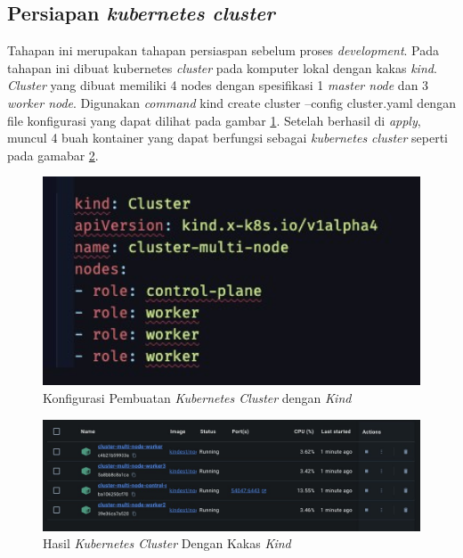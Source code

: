 \subsection{Persiapan \textit{kubernetes cluster}}
\label{subsec:persiapan-kubernetes-cluster}

Tahapan ini merupakan tahapan persiaspan sebelum proses \textit{development}. Pada tahapan ini dibuat kubernetes \textit{cluster} pada komputer lokal dengan kakas \textit{kind}. \textit{Cluster} yang dibuat memiliki 4 nodes dengan spesifikasi 1 \textit{master node} dan 3 \textit{worker node}. Digunakan \textit{command} kind create cluster --config cluster.yaml dengan file konfigurasi yang dapat dilihat pada gambar \ref{fig:konfigurasi-pembuatan-cluster}. Setelah berhasil di \textit{apply}, muncul 4 buah kontainer yang dapat berfungsi sebagai \textit{kubernetes cluster} seperti pada gamabar \ref{fig:hasil-cluster-kind}.

\begin{figure}[htbp]
    \centering
    \includegraphics[width=1\textwidth]{resources/appendix/pembuatan-cluster.jpg}
    \caption{Konfigurasi Pembuatan \textit{Kubernetes Cluster} dengan \textit{Kind}}
    \label{fig:konfigurasi-pembuatan-cluster}
\end{figure}

\begin{figure}[htbp]
    \centering
    \includegraphics[width=1\textwidth]{resources/chapter-4/cluster-kind.jpg}
    \caption{Hasil \textit{Kubernetes Cluster} Dengan Kakas \textit{Kind}}
    \label{fig:hasil-cluster-kind}
\end{figure}

\pagebreak